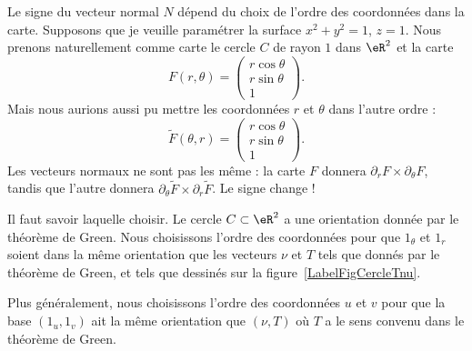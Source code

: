 Le signe du vecteur normal \( N\) dépend du choix de l'ordre des coordonnées dans la carte. Supposons que je veuille paramétrer la surface \( x^2+y^2=1\), \( z=1\). Nous prenons naturellement comme carte le cercle \( C\) de rayon \( 1\) dans \( \eR^2\) et la carte
\begin{equation}
	F(r,\theta)=\begin{pmatrix}
		r\cos\theta \\
		r\sin\theta \\
		1
	\end{pmatrix}.
\end{equation}
Mais nous aurions aussi pu mettre les coordonnées \( r\) et \( \theta\) dans l'autre ordre :
\begin{equation}
	\tilde F(\theta,r)=\begin{pmatrix}
		r\cos\theta \\
		r\sin\theta \\
		1
	\end{pmatrix}.
\end{equation}
Les vecteurs normaux ne sont pas les même : la carte \( F\) donnera \( \partial_rF\times\partial_{\theta}F\), tandis que l'autre donnera \( \partial_{\theta}\tilde F\times\partial_r\tilde F\). Le signe change !

Il faut savoir laquelle choisir. Le cercle \( C\subset \eR^2\) a une orientation donnée par le théorème de Green. Nous choisissons l'ordre des coordonnées pour que \( 1_{\theta}\) et \( 1_{r}\) soient dans la même orientation que les vecteurs \( \nu\) et \( T\) tels que donnés par le théorème de Green, et tels que dessinés sur la figure~\ref{LabelFigCercleTnu}.
\newcommand{\CaptionFigCercleTnu}{L'orientation sur le cercle. Si nous les prenons dans l'ordre, les vecteurs \( (1_r,1_{\theta})\) ont la même orientation que celle donnée par les vecteurs \( (\nu,T)\) donnés par la convention de Green.}


%

Plus généralement, nous choisissons l'ordre des coordonnées \( u\) et \( v\) pour que la base \( (1_u,1_v)\) ait la même orientation que \( (\nu,T)\) où \( T\) a le sens convenu dans le théorème de Green.

